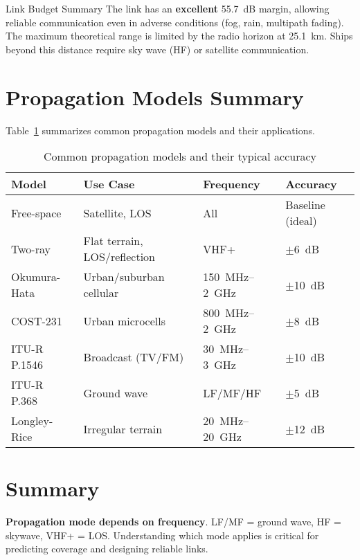 \begin{calloutbox}[colback=black!8!white,colframe=black]{Link Budget Summary}
The link has an \textbf{excellent} 55.7~dB margin, allowing reliable communication even in adverse conditions (fog, rain, multipath fading). The maximum theoretical range is limited by the radio horizon at 25.1~km. Ships beyond this distance require sky wave (HF) or satellite communication.
\end{calloutbox}

\section{Propagation Models Summary}

Table~\ref{tab:propagation-models} summarizes common propagation models and their applications.

\begin{table}[htbp]
\centering
\caption{Common propagation models and their typical accuracy}
\label{tab:propagation-models}
\begin{tabular}{@{}llll@{}}
\toprule
\textbf{Model} & \textbf{Use Case} & \textbf{Frequency} & \textbf{Accuracy} \\
\midrule
Free-space & Satellite, LOS & All & Baseline (ideal) \\
Two-ray & Flat terrain, LOS/reflection & VHF+ & $\pm$6~dB \\
Okumura-Hata & Urban/suburban cellular & 150~MHz--2~GHz & $\pm$10~dB \\
COST-231 & Urban microcells & 800~MHz--2~GHz & $\pm$8~dB \\
ITU-R P.1546 & Broadcast (TV/FM) & 30~MHz--3~GHz & $\pm$10~dB \\
ITU-R P.368 & Ground wave & LF/MF/HF & $\pm$5~dB \\
Longley-Rice & Irregular terrain & 20~MHz--20~GHz & $\pm$12~dB \\
\bottomrule
\end{tabular}
\end{table}

\section{Summary}

\begin{keyconcept}
\textbf{Propagation mode depends on frequency}. LF/MF = ground wave, HF = skywave, VHF+ = LOS. Understanding which mode applies is critical for predicting coverage and designing reliable links.
\end{keyconcept}

